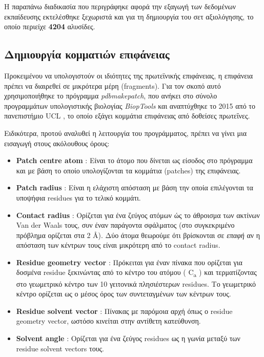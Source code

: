 \medskip
Η παραπάνω διαδικασία που περιγράφηκε αφορά την εξαγωγή των δεδομένων εκπαίδευσης εκτελέσθηκε ξεχωριστά και για τη δημιουργία του σετ αξιολόγησης, το οποίο περιείχε \textbf{4204} αλυσίδες.

\subsection{Δημιουργία κομματιών επιφάνειας}

Προκειμένου να υπολογιστούν οι ιδιότητες της πρωτεϊνικής επιφάνειας, η επιφάνεια πρέπει να διαιρεθεί σε μικρότερα μέρη (fragments). Για τον σκοπό αυτό χρησιμοποιήθηκε το πρόγραμμα \textit{pdbmakepatch}, που ανήκει στο σύνολο προγραμμάτων υπολογιστικής βιολογίας \textit{BiopTools} και αναπτύχθηκε το 2015 από το πανεπιστήμιο UCL \cite{Porter2015}, το οποίο εξάγει κομμάτια επιφάνειας από δοθείσες πρωτεΐνες.

\medskip
Ειδικότερα, προτού αναλυθεί η λειτουργία του προγράμματος, πρέπει να γίνει μια εισαγωγή στους ακόλουθους όρους:

\medskip
\begin{itemize}
    \item \textbf{Patch centre atom} : Είναι το άτομο που δίνεται ως είσοδος στο πρόγραμμα και με βάση το οποίο υπολογίζονται τα κομμάτια (patches) της επιφάνειας. \\
    \item \textbf{Patch radius} : Είναι η ελάχιστη απόσταση με βάση την οποία επιλέγονται τα υποψήφια residues για το τελικό κομμάτι. \\
    \item \textbf{Contact radius} : Ορίζεται για ένα ζεύγος ατόμων ώς το άθροισμα των ακτίνων Van der Waals τους, συν έναν παράγοντα σφάλματος (στο συγκεκριμένο πρόβλημα ορίζεται στα 2 \AA ). Δύο άτομα θεωρούμε ότι βρίσκονται σε \textit{επαφή} αν η απόσταση των κέντρων τους είναι μικρότερη από το contact radius. \\
    \item \textbf{Residue geometry vector} : Πρόκειται για έναν πίνακα που ορίζεται για δοσμένα residue ξεκινώντας από το κέντρο του ατόμου ( C\textsubscript{a} ) και τερματίζοντας στο γεωμετρικό κέντρο των 10 γειτονικά πλησιέστερων residues. Το γεωμετρικό κέντρο ορίζεται ως ο μέσος όρος των συντεταγμένων των κέντρων τους. \\
    \item \textbf{Residue solvent vector} : Πίνακας με παρόμοια αρχή όπως ο residue geometry vector, ωστόσο κινείται στην αντίθετη κατεύθυνση. \\
    \item \textbf{Solvent angle} : Ορίζεται για ένα ζεύγος residues ως η γωνία μεταξύ των residue solvent vectors τους. \\
\end{itemize}

